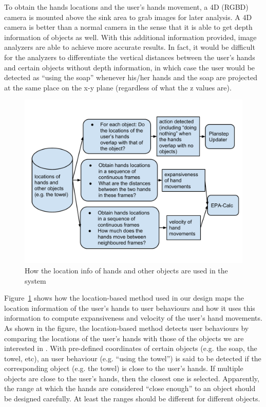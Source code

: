 To obtain the hands locations and the user's hands movement, a 4D (RGBD) camera is mounted above the sink area to grab images for later analysis. A 4D camera is better than a normal camera in the sense that it is able to get depth information of objects as well. With this additional information provided, image analyzers are able to achieve more accurate results. In fact, it would be difficult for the analyzers to differentiate the vertical distances between the user's hands and certain objects without depth information, in which case the user would be detected as ``using the soap'' whenever his/her hands and the soap are projected at the same place on the x-y plane (regardless of what the z values are). 

\begin{figure}[h!]
\centering
\includegraphics[width=0.9\linewidth]{fig-location-use.pdf}
\caption{How the location info of hands and other objects are used in the system}
\label{fig:location-use}
\end{figure}

Figure~\ref{fig:location-use} shows how the location-based method used in our design maps the location information of the user's hands to user behaviours and how it uses this information to compute expansiveness and velocity of the user's hand movements. As shown in the figure, the location-based method detects user behaviours by comparing the locations of the user's hands with those of the objects we are interested in \cite{boger2005decision, czarnuch2014}. With pre-defined coordinates of certain objects (e.g. the soap, the towel, etc), an user behaviour (e.g. ``using the towel'') is said to be detected if the corresponding object (e.g. the towel) is close to the user's hands. If multiple objects are close to the user's hands, then the closest one is selected. Apparently, the range at which the hands are considered ``close enough'' to an object should be designed carefully. At least the ranges should be different for different objects. 


